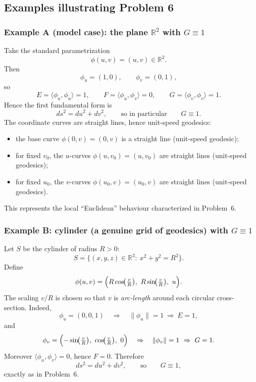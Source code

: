 \documentclass[12pt,a4paper]{article}
\theoremstyle{plain}
\theoremstyle{definition}      %
\begin{document}
	\subsection*{Examples illustrating Problem 6}
	
	\subsubsection*{Example A (model case): the plane $\mathbb{R}^2$ with $G\equiv 1$}
	Take the standard parametrization
	\[
	\phi(u,v)=(u,v)\in\mathbb{R}^2.
	\]
	Then
	\[
	\phi_u=(1,0),\qquad \phi_v=(0,1),
	\]
	so
	\[
	E=\langle \phi_u,\phi_u\rangle=1,\qquad
	F=\langle \phi_u,\phi_v\rangle=0,\qquad
	G=\langle \phi_v,\phi_v\rangle=1.
	\]
	Hence the first fundamental form is
	\[
	ds^2 = du^2 + dv^2,
	\qquad\text{so in particular}\qquad
	G\equiv 1.
	\]
	The coordinate curves are straight lines, hence unit-speed geodesics:
	\begin{itemize}
		\item the base curve $\phi(0,v)=(0,v)$ is a straight line (unit-speed geodesic);
		\item for fixed $v_0$, the $u$-curves $\phi(u,v_0)=(u,v_0)$ are straight lines (unit-speed geodesics);
		\item for fixed $u_0$, the $v$-curves $\phi(u_0,v)=(u_0,v)$ are straight lines (unit-speed geodesics).
	\end{itemize}
	This represents the local ``Euclidean'' behaviour characterized in Problem~6.
	
	\subsubsection*{Example B: cylinder (a genuine grid of geodesics) with $G\equiv 1$}
	Let $S$ be the cylinder of radius $R>0$:
	\[
	S=\{(x,y,z)\in\mathbb{R}^3:\ x^2+y^2=R^2\}.
	\]
	Define
	\[
	\phi(u,v)=\Bigl(R\cos\!\bigl(\tfrac{v}{R}\bigr),\ R\sin\!\bigl(\tfrac{v}{R}\bigr),\ u\Bigr).
	\]
	The scaling $v/R$ is chosen so that $v$ is \emph{arc-length} around each circular cross-section.
	Indeed,
	\[
	\phi_u=(0,0,1)\quad\Rightarrow\quad \|\phi_u\|=1\ \Rightarrow\ E=1,
	\]
	and
	\[
	\phi_v=\Bigl(-\sin\!\bigl(\tfrac{v}{R}\bigr),\ \cos\!\bigl(\tfrac{v}{R}\bigr),\ 0\Bigr)
	\quad\Rightarrow\quad
	\|\phi_v\|=1\ \Rightarrow\ G=1.
	\]
	Moreover $\langle \phi_u,\phi_v\rangle=0$, hence $F=0$. Therefore
	\[
	ds^2 = du^2 + dv^2,
	\qquad\text{so}\qquad
	G\equiv 1,
	\]
	exactly as in Problem~6.
	
\end{document}
